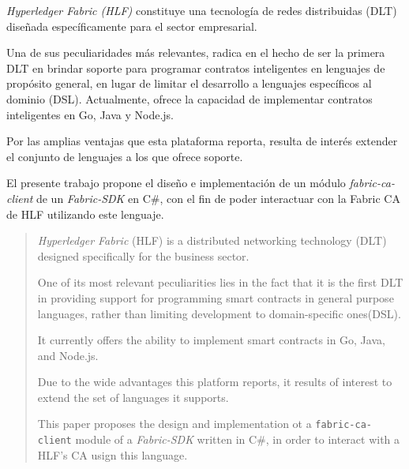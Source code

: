 \begin{resumen}
\emph{Hyperledger Fabric (HLF)} constituye una tecnolog\'ia de redes distribuidas (DLT) dise\~nada espec\'ificamente para el sector empresarial. 

Una de sus peculiaridades m\'as relevantes, radica en el hecho de ser la primera DLT en brindar soporte para programar contratos inteligentes en lenguajes de prop\'osito general, en lugar de limitar el desarrollo a lenguajes espec\'ificos al dominio (DSL). Actualmente, ofrece la capacidad de implementar contratos inteligentes en Go, Java y Node.js.

Por las amplias ventajas que esta plataforma reporta, resulta de inter\'es extender el conjunto de lenguajes a los que ofrece soporte.

El presente trabajo propone el diseño e implementaci\'on de un m\'odulo \emph{fabric-ca-client} de un \emph{Fabric-SDK} en C\#, con el fin de poder interactuar con la Fabric CA de HLF utilizando este lenguaje. 
\end{resumen}

\begin{abstract}
	\emph{Hyperledger Fabric} (HLF) is a distributed networking technology (DLT)
	designed specifically for the business sector.
	
	One of its most relevant peculiarities lies in the fact that it is the first DLT
	in providing support for programming smart contracts in general purpose languages, rather than limiting development to domain-specific ones(DSL).
	
	It currently offers the ability to implement smart contracts in Go, Java, and Node.js.
	
	Due to the wide advantages this platform reports, it results of interest to extend the set of languages it supports.
	
	This paper proposes the design and implementation ot a \texttt{fabric-ca-client} module of a \emph{Fabric-SDK} written in C\#, in order to interact with a HLF's CA usign this language.
\end{abstract}

